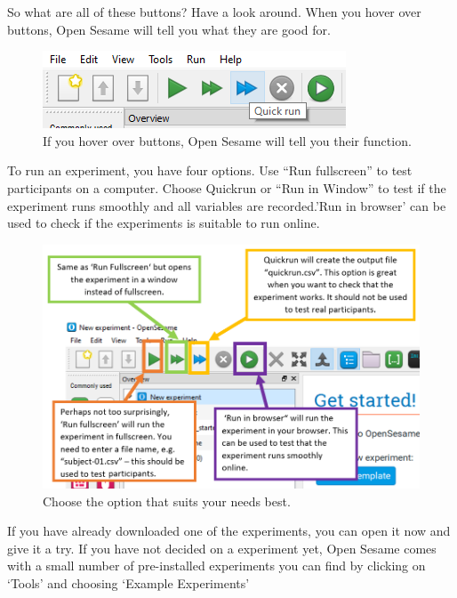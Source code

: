 \documentclass[
]{book}
\begin{document}
So what are all of these buttons? Have a look around. When you hover over buttons, Open Sesame will tell you what they are good for.

\begin{figure}

{\centering \includegraphics[width=0.85\linewidth]{images/opensesame/hover} 

}

\caption{If you hover over buttons, Open Sesame will tell you their function.}\label{fig:Figure12-3}
\end{figure}

To run an experiment, you have four options. Use ``Run fullscreen'' to test participants on a computer. Choose Quickrun or ``Run in Window'' to test if the experiment runs smoothly and all variables are recorded.'Run in browser' can be used to check if the experiments is suitable to run online.

\begin{figure}

{\centering \includegraphics[width=0.85\linewidth]{images/opensesame/runexp} 

}

\caption{Choose the option that suits your needs best.}\label{fig:Figure12-4}
\end{figure}

If you have already downloaded one of the experiments, you can open it now and give it a try. If you have not decided on a experiment yet, Open Sesame comes with a small number of pre-installed experiments you can find by clicking on `Tools' and choosing `Example Experiments'
\end{document}

